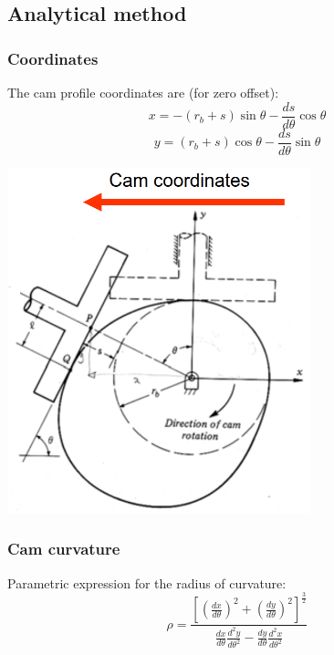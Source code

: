 \documentclass[11pt]{article}
\begin{document}
\begin{enumerate}
\begin{center}
\end{center}
\end{enumerate}
\subsection{Analytical method}
\label{sec:orgc047611}

\subsubsection{Coordinates}
\label{sec:org8d556a6}
The cam profile coordinates are (for zero offset):
\[x = - (r_b + s) \sin \theta - \frac{ds}{d \theta} \cos \theta\]
\[y = (r_b + s) \cos \theta - \frac{ds}{d \theta} \sin \theta \tag{1}\]

\begin{center}
\includegraphics[width=.9\linewidth]{./images/cam-profile-design-analytical-method-diagram.png}
\end{center}
\subsubsection{Cam curvature}
\label{sec:org0d9cdc6}
Parametric expression for the radius of curvature:
\[\rho = \frac{\left[\left(\frac{dx}{d \theta} \right)^2 + \left(\frac{dy}{d \theta} \right)^2 \right]^{\frac{3}{2}}}{\frac{dx}{d \theta} \frac{d^2 y}{d \theta^2} - \frac{dy}{d \theta} \frac{d^2 x}{ d \theta^2}} \tag{2}\]
\end{document}
